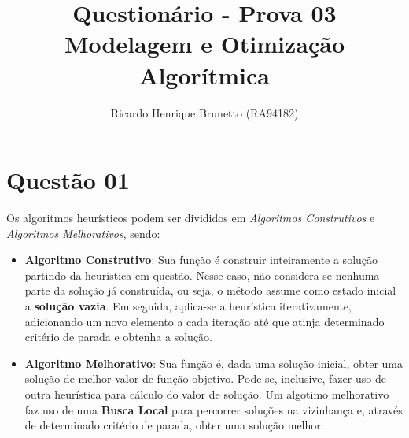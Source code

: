 

\sloppy

\title{Questionário - Prova 03\\Modelagem e Otimização Algorítmica}

\author{Ricardo Henrique Brunetto (RA94182)}


\address{Departamento de Informática -- Universidade Estadual de Maringá (UEM)\\
	Maringá -- PR -- Brasil
}



	\maketitle


  \section*{Questão 01}
	Os algoritmos heurísticos podem ser divididos em \textit{Algoritmos Construtivos} e \textit{Algoritmos Melhorativos},
	sendo:
	\begin{itemize}
		\item \textbf{Algoritmo Construtivo}: Sua função é construir inteiramente a solução
		partindo da heurística em questão. Nesse caso, não considera-se nenhuma parte da solução
		já construída, ou seja, o método assume como estado inicial a \textbf{solução vazia}.
		Em seguida, aplica-se a heurística iterativamente, adicionando um novo elemento a
		cada iteração até que atinja determinado critério de parada e obtenha a solução.

		\item \textbf{Algoritmo Melhorativo}: Sua função é, dada uma solução inicial,
		obter uma solução de melhor valor de função objetivo. Pode-se, inclusive, fazer uso
		de outra heurística para cálculo do valor de solução. Um algotimo melhorativo
		faz uso de uma \textbf{Busca Local} para percorrer soluções na vizinhança
		e, através de determinado critério de parada, obter uma solução melhor.
	\end{itemize}

